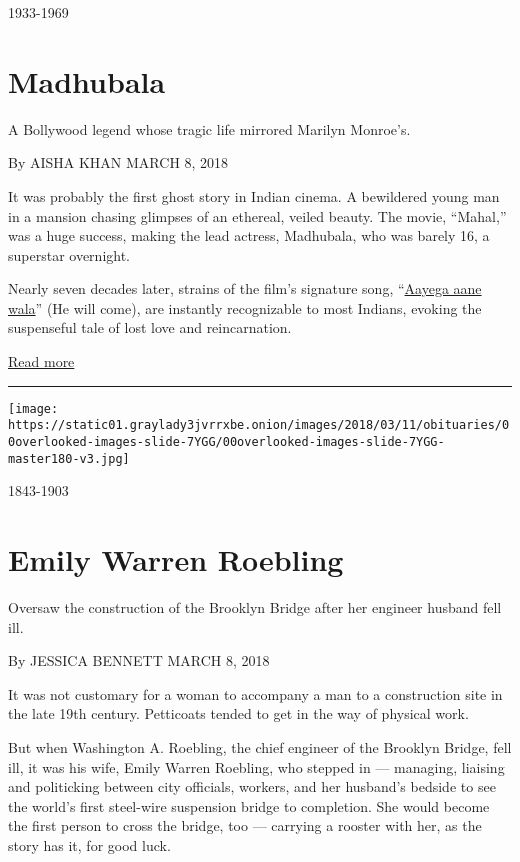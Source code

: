 1933-1969

\hypertarget{madhubala}{%
\section{Madhubala}\label{madhubala}}

A Bollywood legend whose tragic life mirrored Marilyn Monroe's.

By AISHA KHAN MARCH 8, 2018

It was probably the first ghost story in Indian cinema. A bewildered
young man in a mansion chasing glimpses of an ethereal, veiled beauty.
The movie, ``Mahal,'' was a huge success, making the lead actress,
Madhubala, who was barely 16, a superstar overnight.

Nearly seven decades later, strains of the film's signature song,
``\href{https://www.youtube.com/watch?v=03DXW_rV54U}{Aayega aane wala}''
(He will come), are instantly recognizable to most Indians, evoking the
suspenseful tale of lost love and reincarnation.

\href{https://www.nytimes3xbfgragh.onion/interactive/2018/obituaries/overlooked-madhubala.html}{Read
more}

\begin{center}\rule{0.5\linewidth}{\linethickness}\end{center}

\texttt{[image: https://static01.graylady3jvrrxbe.onion/images/2018/03/11/obituaries/00overlooked-images-slide-7YGG/00overlooked-images-slide-7YGG-master180-v3.jpg]}

1843-1903

\hypertarget{emily-warren-roebling}{%
\section{Emily Warren Roebling}\label{emily-warren-roebling}}

Oversaw the construction of the Brooklyn Bridge after her engineer
husband fell ill.

By JESSICA BENNETT MARCH 8, 2018

It was not customary for a woman to accompany a man to a construction
site in the late 19th century. Petticoats tended to get in the way of
physical work.

But when Washington A. Roebling, the chief engineer of the Brooklyn
Bridge, fell ill, it was his wife, Emily Warren Roebling, who stepped in
--- managing, liaising and politicking between city officials, workers,
and her husband's bedside to see the world's first steel-wire suspension
bridge to completion. She would become the first person to cross the
bridge, too --- carrying a rooster with her, as the story has it, for
good luck.

